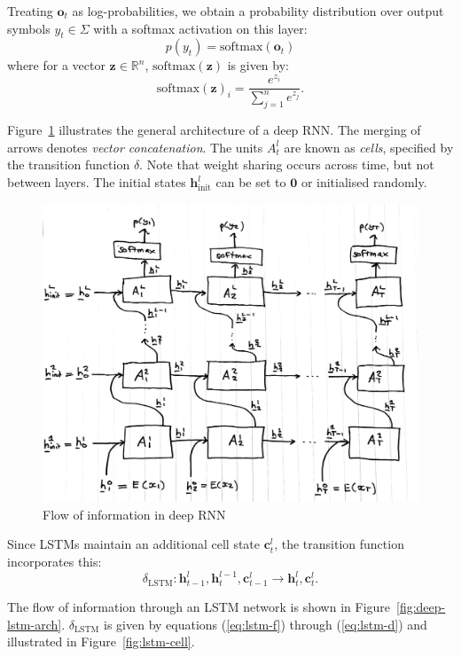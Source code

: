 \documentclass[12pt,a4paper,twoside,openright]{report}
\newcommand{\vect}[1]{\boldsymbol{\mathbf{#1}}}
\begin{document}
Treating $\vect{o}_t$ as log-probabilities, we obtain a probability distribution
over output symbols $y_t \in \Sigma$ with a softmax activation on this layer:
$$ p(y_t) = \mathrm{softmax}(\vect{o}_t) $$
where for a vector $\vect{z} \in \mathbb{R}^n$, $\mathrm{softmax}(\vect{z})$ is
given by:
$$ \mathrm{softmax}(\vect{z})_i = \frac{ e^{z_i} }{ \sum_{j = 1}^n e^{z_j} }. $$

Figure~\ref{fig:deep-rnn-arch} illustrates the general architecture of a deep
RNN. The merging of arrows denotes \emph{vector concatenation}. The units
$A_t^l$ are known as \emph{cells}, specified by the transition function
$\delta$.  Note that weight sharing occurs across time, but not between layers.
The initial states $\vect{h}_{\mathrm{init}}^l$ can be set to $\vect{0}$ or
initialised randomly.

\begin{figure}[H]
\centering
\includegraphics[width=400pt]{figs/deep_rnn_tmp.jpg}
\caption{Flow of information in deep RNN}
\label{fig:deep-rnn-arch}
\end{figure}

Since LSTMs maintain an additional cell state $\vect{c}_t^l$, the transition
function incorporates this:
$$ \delta_{\mathrm{LSTM}} : \vect{h}_{t-1}^l, \vect{h}_t^{l-1}, \vect{c}_{t-1}^l
\rightarrow \vect{h}_t^l, \vect{c}_t^l. $$

The flow of information through an LSTM network is shown in
Figure~\ref{fig:deep-lstm-arch}. $\delta_{\mathrm{LSTM}}$ is given by equations
(\ref{eq:lstm-f}) through (\ref{eq:lstm-d}) and illustrated in
Figure~\ref{fig:lstm-cell}.
\end{document}
